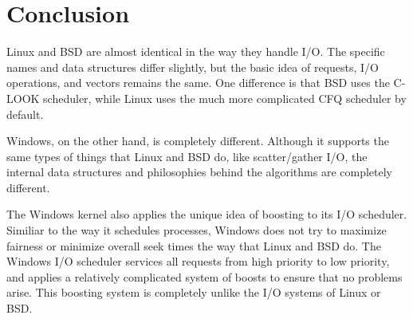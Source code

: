 \documentclass[10pt,journal,draftclsnofoot,onecolumn]{IEEEtran}
\begin{document}
\section{Conclusion}
Linux and BSD are almost identical in the way they handle I/O. The
specific names and data structures differ slightly, but the basic
idea of requests, I/O operations, and vectors remains the same. One
difference is that BSD uses the C-LOOK scheduler, while Linux uses
the much more complicated CFQ scheduler by default.

Windows, on the other hand, is completely different. Although it
supports the same types of things that Linux and BSD do, like
scatter/gather I/O, the internal data structures and philosophies
behind the algorithms are completely different.

The Windows kernel also applies the unique idea of boosting to
its I/O scheduler. Similiar to the way it schedules processes,
Windows does not try to maximize fairness or minimize overall
seek times the way that Linux and BSD do. The Windows I/O scheduler
services all requests from high priority to low priority, and applies
a relatively complicated system of boosts to ensure that no
problems arise. This boosting system is completely unlike the I/O
systems of Linux or BSD.
%
%
%

\end{document}
